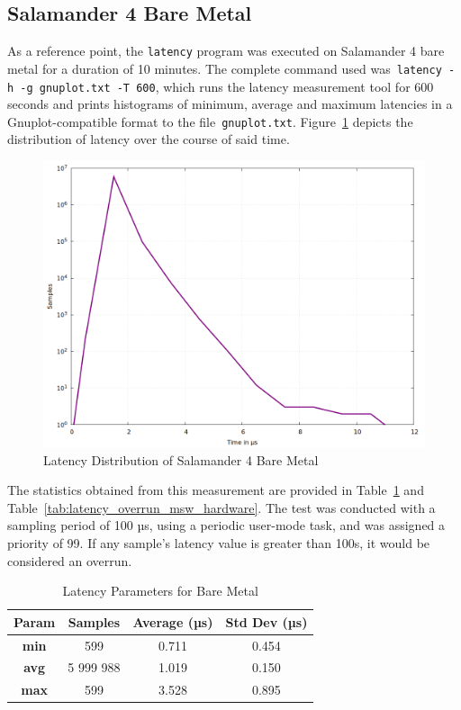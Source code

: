 \documentclass[MMR,Master,english]{twbook}
\begin{document}
\subsection{Salamander 4 Bare Metal}\label{subsec:salamander4-bare-metal}
As a reference point, the \texttt{latency} program was executed on Salamander 4 bare metal for a duration of 10 minutes. The complete command used was~\texttt{latency -h -g gnuplot.txt -T 600}, which runs the latency measurement tool for 600 seconds and prints histograms of minimum, average and maximum latencies in a Gnuplot-compatible format to the file~\texttt{gnuplot.txt}. Figure~\ref{fig:gnuplot_max_latency_hardware} depicts the distribution of latency over the course of said time.

\begin{figure}[H]
	\centering
	\includegraphics[width=0.7\columnwidth]{masterthesis-documentation/docs/sigmatek/xenomai/0hardware/gnuplot_max_latency_hardware.png}
	\caption[Latency Distribution of Salamander 4 Bare Metal]{Latency Distribution of Salamander 4 Bare Metal}
	\label{fig:gnuplot_max_latency_hardware}
\end{figure}

\noindent The statistics obtained from this measurement are provided in Table~\ref{tab:latency_stats_hardware} and Table~\ref{tab:latency_overrun_msw_hardware}. The test was conducted with a sampling period of 100 µs, using a periodic user-mode task, and was assigned a priority of 99. If any sample's latency value is greater than 100\textmu s, it would be considered an overrun.

\begin{table}[H]
	\centering
	\caption{Latency Parameters for Bare Metal}
	\label{tab:latency_stats_hardware}
	\begin{tabular}{|c|c|c|c|}
		\hline
		\textbf{Param} & \textbf{Samples} & \textbf{Average (µs)} & \textbf{Std Dev (µs)} \\ \hline
		\textbf{min}   & 599              & 0.711                 & 0.454                 \\ \hline
		\textbf{avg}   & 5 999 988        & 1.019                 & 0.150                 \\ \hline
		\textbf{max}   & 599              & 3.528                 & 0.895                 \\ \hline
	\end{tabular}
\end{table}
\end{document}
